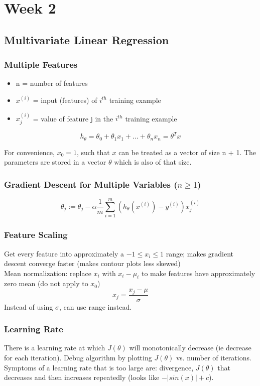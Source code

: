 \documentclass[11pt,letterpaper]{article}
\begin{document}
\section{Week 2}

\subsection{Multivariate Linear Regression}
\subsubsection{Multiple Features}
\begin{itemize}
	\item n = number of features
	\item $x^{(i)}$ = input (features) of $i^{th}$ training example
	\item $x_j^{(i)}$ = value of feature j in the $i^{th}$ training example
\end{itemize}
$$h_\theta = \theta_0 + \theta_1x_1 + ... + \theta_n x_n = \theta^Tx$$

For convenience, $x_0 = 1$, such that $x$ can be treated as a vector of size n + 1. The parameters are stored in a vector $\theta$ which is also of that size.

\subsubsection{Gradient Descent for Multiple Variables ($n \geq 1$)}

$$ \theta_j := \theta_j - \alpha \frac{1}{m}\sum_{i=1}^{m}(h_\theta(x^{(i)}) -y^{(i)}) x_j^{(i)}$$

\subsubsection{Feature Scaling}
Get every feature into approximately a $-1 \leq x_i \leq 1$ range; makes gradient descent converge faster (makes contour plots less skewed)\\
Mean normalization: replace $x_i$ with $x_i - \mu_i$ to make features have approximately zero mean (do not apply to $x_0$) $$x_j = \frac{x_j - \mu}{\sigma}$$
Instead of using $\sigma$, can use range instead.

\subsubsection{Learning Rate}
There is a learning rate at which $J(\theta)$ will monotonically decrease (ie decrease for each iteration). Debug algorithm by plotting $J(\theta)$ vs. number of iterations.
Symptoms of a learning rate that is too large are: divergence, $J(\theta)$ that decreases and then increases repeatedly (looks like $-|sin(x)| + c$).
\end{document}
